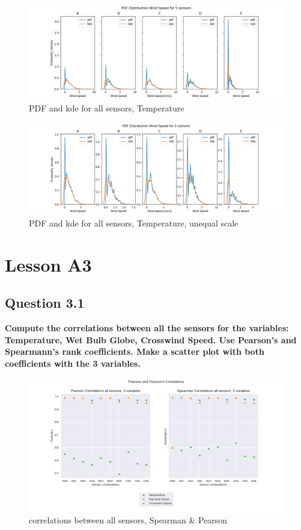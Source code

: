 \documentclass{report}
\begin{document}
	
	\begin{figure}[h!]
		\centering
		\includegraphics[width=\linewidth]{GEO1001_hw01_images/GEO1001_hw01_A2_kde_compare.png}
		\caption{PDF and kde for all sensors, Temperature}
		\label{fig:kde}
	\end{figure}

	\begin{figure}[h!]
		\centering
		\includegraphics[width=\linewidth]{GEO1001_hw01_images/GEO1001_hw01_A2_kde_original.png}
		\caption{PDF and kde for all sensors, Temperature, unequal scale}
		\label{fig:kdeunequal}
	\end{figure}
	
	\section{Lesson A3}
	
	\subsection{Question 3.1}
	\textbf{Compute the correlations between all the sensors for the variables: Temperature, Wet Bulb Globe, Crosswind Speed. Use Pearson’s and Spearmann’s rank coefficients. Make a scatter plot with both coefficients with the 3 variables.}
	
	\begin{figure}[H]
		\centering
		\includegraphics[width=\linewidth]{GEO1001_hw01_images/GEO1001_hw01_A3_correlations.png}
		\caption{correlations between all sensors, Spearman \& Pearson}
		\label{fig:corr}
	\end{figure}
	
\end{document}
